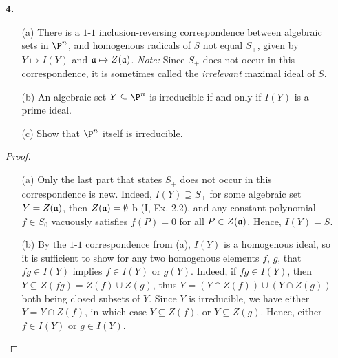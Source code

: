 \documentclass[a4paper]{article}
\begin{document}
\begin{enumerate} [label=\textbf{\arabic*.}, leftmargin=0cm]
\begin{proof}
              (ii) $\Rightarrow$ (iii) Either case $S_+ \subseteq \sqrt{\goth{a}}$, so $x_i^{d_i} \in \goth{a}$ for some $d_i \geq 0$ for each $i$, which implies $S_d \subseteq \goth{a}$ where $d = \max{d_i}$.

              (iii) $\Rightarrow$ (i) Let $d > 0$ be the smallest integer such that $\goth{a} \supseteq S_d$, then we have $\goth{a} \supseteq \bigoplus_{l \geq d} S_l$ so that $x_i^l \in \goth{a}$ for all $0 \leq i \leq n$ and $l \geq d$.
              If there exists $P = (a_0, \dots, a_n) \in Z(\goth{a})$, then $a_i^d = a_i^{d + 1} = 0$, which implies $a_i = 0$ for all $0 \leq i \leq n$, which is impossible.
          \end{proof}

    \item[\textbf{4.}] \begin{itemize}
              \item[(a)] There is a $1$-$1$ inclusion-reversing correspondence between algebraic sets in $\P^n$, and homogenous radicals of $S$ not equal $S_+$, given by $Y \mapsto I(Y)$ and $\mathfrak{a} \mapsto Z(\mathfrak{a})$.
                    \textit{Note:} Since $S_+$ does not occur in this correspondence, it is sometimes called the \textit{irrelevant} maximal ideal of $S$.

              \item[(b)] An algebraic set $Y \subseteq \P^n$ is irreducible if and only if $I(Y)$ is a prime ideal.

              \item[(c)] Show that $\P^n$ itself is irreducible.
          \end{itemize}

          \begin{proof} $ $ \vspace{0pt}
              \begin{itemize} [leftmargin=0cm]
                  \item[(a)] Only the last part that states $S_+$ does not occur in this correspondence is new. Indeed, $I(Y) \supseteq S_+$ for some algebraic set $Y = Z(\mathfrak{a})$, then $Z(\mathfrak{a}) = \emptyset$ b (I, Ex. 2.2), and any constant polynomial $f \in S_0$ vacuously satisfies $f(P) = 0$ for all $P \in Z(\mathfrak{a})$. Hence, $I(Y) = S$.

                  \item[(b)] By the $1$-$1$ correspondence from (a), $I(Y)$ is a homogenous ideal, so it is sufficient to show for any two homogenous elements $f$, $g$, that $fg \in I(Y)$ implies $f \in I(Y)$ or $g(Y)$. Indeed, if $fg \in I(Y)$, then $Y \subseteq Z(fg) = Z(f) \cup Z(g)$, thus $Y = (Y \cap Z(f)) \cup (Y \cap Z(g))$ both being closed subsets of $Y$. Since $Y$ is irreducible, we have either $Y = Y \cap Z(f)$, in which case $Y \subseteq Z(f)$, or $Y \subseteq Z(g)$. Hence, either $f \in I(Y)$ or $g \in I(Y)$.


\end{itemize}
\end{proof}
\end{enumerate}
\end{document}
